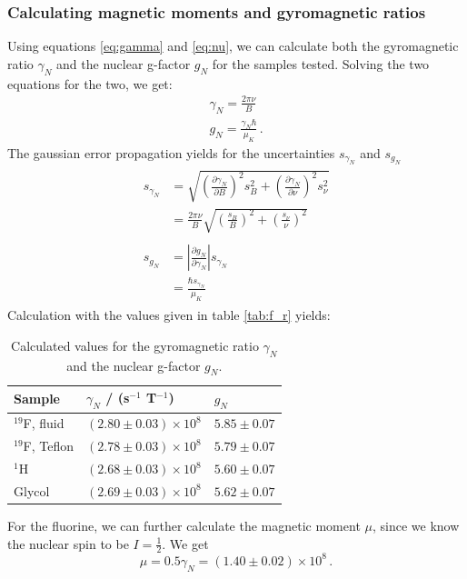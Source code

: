 \subsubsection{Calculating magnetic moments and gyromagnetic ratios}
Using equations \eqref{eq:gamma} and \eqref{eq:nu}, we can calculate both 
the gyromagnetic ratio $\gamma_N$ and the nuclear g-factor $g_N$ for the samples 
tested. Solving the two equations for the two, we get:
\begin{align}
    \gamma_N = \frac{2 \pi \nu}{B} \\
    g_N = \frac{\gamma_N \hbar}{\mu_K} \,.
\end{align}
The gaussian error propagation yields for the uncertainties $s_{\gamma_N}$ and $s_{g_N}$ 
\begin{align}
    \begin{split}
        s_{\gamma_N} &= \sqrt{
            \left(\frac{\partial \gamma_N}{\partial B}\right)^2 s_B^2 + 
            \left(\frac{\partial \gamma_N}{\partial \nu}\right)^2 s_\nu^2}  \\
        &= \frac{2 \pi \nu}{B}\sqrt{
            \left(\frac{s_B}{B}\right)^2 +\left(\frac{s_\nu}{\nu}\right)^2 }
    \end{split} \\
    \begin{split}
    s_{g_N} &= 
        \left|\frac{\partial g_N}{\partial \gamma_N}\right| s_{\gamma_N} \\
        &= \frac{\hbar s_{\gamma_N}}{\mu_K}
    \end{split}
\end{align}
Calculation with the values given in table \ref{tab:f_r} yields:
\renewcommand{\arraystretch}{1.5}
\begin{table}[htdp]
\centering
\begin{tabular}{|p{6.18cm}|p{3.82cm}|p{3.82cm}|}
        \hline
        \rowcolor{LightCyan}
        Sample & $\gamma_N$ / (s$^{-1}$ T$^{-1}$) & $g_N$ \\ \hline
        $^{19}$F, fluid     & $\left(2.80 \pm 0.03\right) \times 10^{8}$ & $5.85 \pm 0.07$ \\
        $^{19}$F, Teflon    & $\left(2.78 \pm 0.03\right) \times 10^{8}$ & $5.79 \pm 0.07$ \\
        $^1$H               & $\left(2.68 \pm 0.03\right) \times 10^{8}$ & $5.60 \pm 0.07$ \\
        Glycol              & $\left(2.69 \pm 0.03\right) \times 10^{8}$ & $5.62 \pm 0.07$ \\
        \hline
    \end{tabular}
    \caption{
        Calculated values for the gyromagnetic ratio $\gamma_N$ and the nuclear g-factor $g_N$. 
        }
    \label{tab:g_N}
\end{table}
For the fluorine, we can further calculate the magnetic moment $\mu$, since we know the 
nuclear spin to be $I = \frac{1}{2}$. We get 
\begin{equation}
    \mu = 0.5  \gamma_N = \left(1.40 \pm 0.02\right) \times 10^8 \, .
\end{equation}


